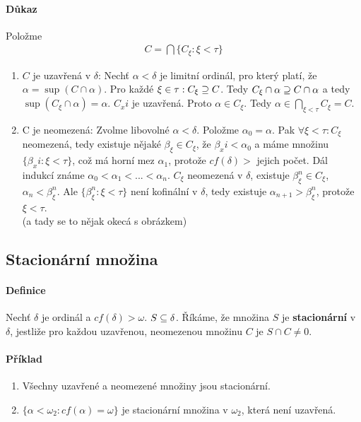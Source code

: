 \documentclass[a4paper,12pt,titlepage]{article}
\begin{document}
\paragraph{Důkaz}
Položme 
\begin{align}
	C = \bigcap \{C_\xi: \xi < \tau \}
\end{align}
\begin{enumerate}
	\item $C$ je uzavřená v $\delta$: Nechť $\alpha < \delta$ je limitní ordinál, pro
	který platí, že $\alpha = \sup(C \cap \alpha)$. Pro každé $\xi \in \tau:
	C_\xi \supseteq C$. Tedy $C_\xi \cap \alpha \supseteq C \cap \alpha$ a tedy
	$\sup(C_\xi \cap \alpha) = \alpha$. $C_xi$ je uzavřená. Proto $\alpha \in
	C_\xi$.
	Tedy $\alpha \in \bigcap_{\xi < \tau} C_\xi = C$.
	\item C je neomezená: Zvolme libovolné $\alpha < \delta$. Položme $\alpha_0
	= \alpha$. Pak
	$\forall \xi < \tau: C_\xi$ neomezená, tedy existuje nějaké $\beta_\xi \in
	C_\xi$, že $\beta_xi < \alpha_0$ a máme množinu $\{ \beta_xi : \xi < \tau
	\}$,
	což má horní mez $\alpha_1$, protože $cf(\delta) >$ jejich počet. Dál indukcí
	známe $\alpha_0 < \alpha_1 < ... < \alpha_n$. $C_\xi$ neomezená v $\delta$,
	existuje $\beta_\xi^n \in C_\xi$, $\alpha_n < \beta_\xi^n$. Ale $\{ \beta_\xi^n :
	\xi < \tau \}$ není kofinální v $\delta$, tedy existuje $\alpha_{n+1} >
	\beta_\xi^n$, protože $\xi < \tau$. \\
	(a tady se to nějak okecá s obrázkem)
\end{enumerate}

\subsection{Stacionární množina}
\setcounter{equation}{0}
\paragraph{Definice}
Nechť $\delta$ je ordinál a $cf(\delta) > \omega$. $S \subseteq \delta$. Říkáme, že
množina $S$ je \textbf{stacionární} v $\delta$, jestliže pro každou uzavřenou,
neomezenou množinu $C$ je $S \cap C \neq 0$.
\paragraph{Příklad}
\begin{enumerate}
	\item Všechny uzavřené a neomezené množiny jsou stacionární.
	\item $\{\alpha < \omega_2: cf(\alpha) = \omega\}$ je stacionární množina v
	$\omega_2$,	která není uzavřená.
\end{enumerate}
\end{document}
